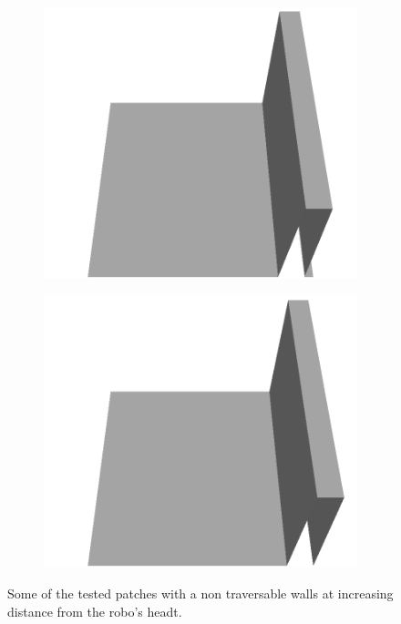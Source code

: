 \documentclass[../document.tex]{subfiles}
\begin{document}
\begin{figure}[htbp]
\begin{subfigure}[b]{0.24\linewidth}
    \includegraphics[width=\linewidth]{../img/5/custom_patches/walls_front/all/21-3d.png}
    \end{subfigure}
    \begin{subfigure}[b]{0.24\linewidth}
    \includegraphics[width=\linewidth]{../img/5/custom_patches/walls_front/all/24-3d.png}
    \end{subfigure}
    \caption{Some of the tested patches with a non traversable walls at increasing distance from the robo's headt.}
    \label{fig : walls-distance}
    \end{figure}
\end{document}
